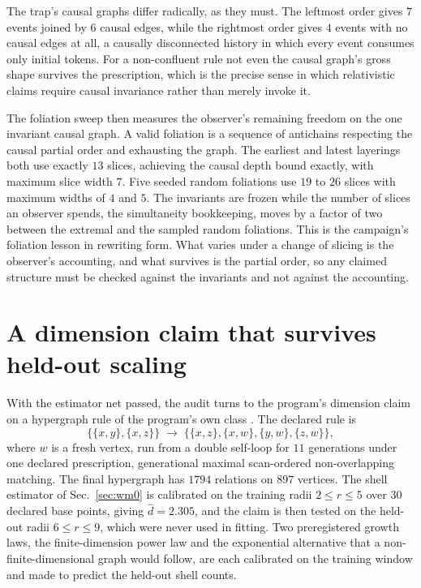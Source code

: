 \documentclass[aps,pre,reprint,nofootinbib]{revtex4-2}
\begin{document}
The trap's causal graphs differ radically, as they must.  The leftmost
order gives $7$ events joined by $6$ causal edges, while the rightmost
order gives $4$ events with no causal edges at all, a causally
disconnected history in which every event consumes only initial
tokens.  For a non-confluent rule not even the causal graph's gross
shape survives the prescription, which is the precise sense in which
relativistic claims require causal invariance rather than merely
invoke it.

The foliation sweep then measures the observer's remaining freedom on
the one invariant causal graph.  A valid foliation is a sequence of
antichains respecting the causal partial order and exhausting the
graph.  The earliest and latest layerings both use exactly $13$
slices, achieving the causal depth bound exactly, with maximum slice
width $7$.  Five seeded random foliations use $19$ to $26$ slices with
maximum widths of $4$ and $5$.  The invariants are frozen while the
number of slices an observer spends, the simultaneity bookkeeping,
moves by a factor of two between the extremal and the sampled random
foliations.  This is the campaign's foliation lesson in rewriting
form.  What varies under a change of slicing is the observer's
accounting, and what survives is the partial order, so any claimed
structure must be checked against the invariants and not against the
accounting.

\section{A dimension claim that survives held-out scaling}
\label{sec:wm4}

With the estimator net passed, the audit turns to the program's
dimension claim on a hypergraph rule of the program's own class
\cite{Wolfram2020}.  The declared rule is
\begin{equation}
  \{\{x,y\},\{x,z\}\} \;\to\;
  \{\{x,z\},\{x,w\},\{y,w\},\{z,w\}\},
  \label{eq:wm4rule}
\end{equation}
where $w$ is a fresh vertex, run from a double self-loop for $11$
generations under one declared prescription, generational maximal
scan-ordered non-overlapping matching.  The final hypergraph has
$1794$ relations on $897$ vertices.  The shell estimator of
Sec.~\ref{sec:wm0} is calibrated on the training radii $2 \le r \le 5$
over $30$ declared base points, giving $\hat d = 2.305$, and the
claim is then tested on the held-out radii $6 \le r \le 9$, which were
never used in fitting.  Two preregistered growth laws, the
finite-dimension power law and the exponential alternative that a
non-finite-dimensional graph would follow, are each calibrated on the
training window and made to predict the held-out shell counts.
\end{document}
